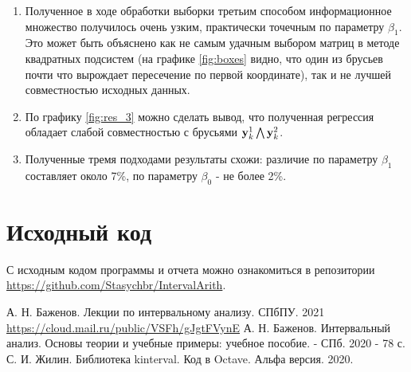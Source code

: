 \documentclass[a4paper]{article}
\begin{document}
\begin{enumerate}
    \item Полученное в ходе обработки выборки третьим способом информационное множество получилось очень узким, практически точечным по параметру $\beta_1$. Это может быть объяснено как не самым удачным выбором матриц в методе квадратных подсистем (на графике \ref{fig:boxes} видно, что один из брусьев почти что вырождает пересечение по первой координате), так и не лучшей совместностью исходных данных.
    \item По графику \ref{fig:res_3} можно сделать вывод, что полученная регрессия обладает слабой совместностью с брусьями $\mathbf{y}_k^1\bigwedge\mathbf{y}_k^2$.
    \item Полученные тремя подходами результаты схожи: различие по параметру $\beta_1$ составляет около 7\%, по параметру $\beta_0$ - не более 2\%.
\end{enumerate}
\section*{Исходный код}
С исходным кодом программы и отчета можно ознакомиться в репозитории \url{https://github.com/Stasychbr/IntervalArith}.
\newpage
\begin{thebibliography}{9}
 А. Н. Баженов. Лекции по интервальному анализу. СПбПУ. 2021
 \url{https://cloud.mail.ru/public/VSFh/gJgtFVynE}
 А. Н. Баженов. Интервальный анализ. Основы теории и учебные примеры: учебное пособие. - СПб. 2020 - 78 с.
 С. И. Жилин. Библиотека kinterval. Код в Octave. Альфа версия. 2020.
\end{thebibliography}
\end{document}
